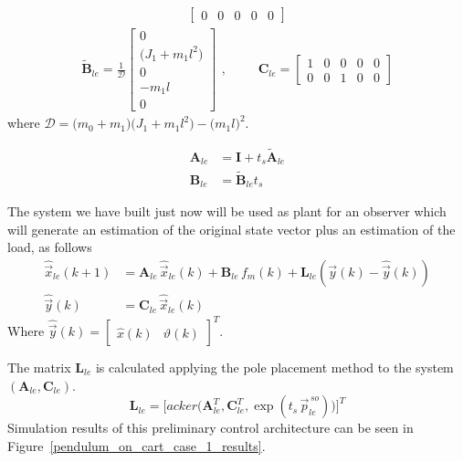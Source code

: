 \documentclass[12pt,a4paper,oneside]{book}
\begin{document}
\begin{onehalfspace}
\begin{equation}
\begin{aligned}
\begin{bmatrix}
			0&0&0&0&0
		\end{bmatrix}
	\end{aligned}
\end{equation}
\begin{equation}\label{pendulum_on_cart_28}
	\begin{aligned}
		\tilde{\mathbf{B}}_{le}=\frac{1}{\mathcal{D}}\begin{bmatrix}
			0 \\[8pt]		
			\big(J_1+m_1l^2\big) \\[8pt]
			0 \\[8pt]
			-m_1l \\[8pt]
			0
		\end{bmatrix}
	\end{aligned},\qquad
	\begin{aligned}
		{\mathbf{C}_{le}}=\begin{bmatrix}
			1&0&0&0&0 \\[8pt]		
			0&0&1&0&0
		\end{bmatrix}
	\end{aligned}
\end{equation}
where $\mathcal{D}=\big(m_0+m_1\big)\big(J_1+m_1l^2\big)-\big(m_1l\big)^2$.

\begin{equation}
	\begin{aligned}
		\mathbf{A}_{le}  &= \mathbf{I}+t_s\tilde{\mathbf{A}}_{le} \\[6pt]
		\mathbf{B}_{le}  &= \tilde{\mathbf{B}}_{le}t_s
	\end{aligned}
\end{equation}

The system we have built just now will be used as plant for an observer which will generate an estimation of the original state vector plus an estimation of the load, as follows
\begin{equation}
	\begin{aligned}
		\hat{\vec{x}}_{le}(k+1)  &= \mathbf{A}_{le} \,\hat{\vec{x}}_{le}(k) +\mathbf{B}_{le} 
		\,f_m(k)+\mathbf{L}_{le} \left( \vec{y}(k) - \hat{\vec{y}}(k) \right)  
		\\[6pt]
		\hat{\vec{y}}(k)  &= \mathbf{C}_{le} \,\hat{\vec{x}}_{le}(k)
	\end{aligned}
\end{equation}
Where $\hat{\vec{y}}(k)=\begin{bmatrix}
	\hat{x}(k) & \hat{\vartheta}(k)
\end{bmatrix}^T$.

The matrix $\mathbf{L}_{le}$ is calculated applying the pole placement method to the 
system $(\mathbf{A}_{le},\mathbf{C}_{le})$.
\begin{equation}
	\mathbf{L}_{le} = 
	\Bigg[acker\Big(\mathbf{A}_{le}^T,\mathbf{C}_{le}^T,\exp(t_s\,\vec{p}_{le}^{\,so})\Big)\Bigg]^T
\end{equation}
Simulation results of this preliminary control architecture can be seen in Figure~\ref{pendulum_on_cart_case_1_results}.


\end{onehalfspace}
\end{document}
